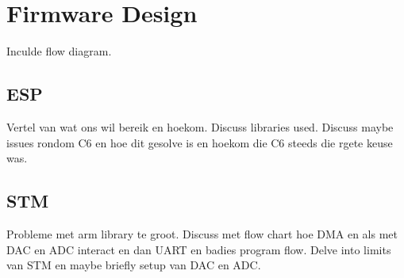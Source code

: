 \section{Firmware Design}
Inculde flow diagram.

\subsection{ESP}
Vertel van wat ons wil bereik en hoekom. Discuss libraries used. Discuss maybe issues rondom C6 en hoe dit gesolve is en hoekom die C6 steeds die rgete keuse was.

\subsection{STM}
Probleme met arm library te groot. Discuss met flow chart hoe DMA en als met DAC en ADC interact en dan UART en badies program flow. Delve into limits van STM en maybe briefly setup van DAC en ADC.

\label{chap:design}